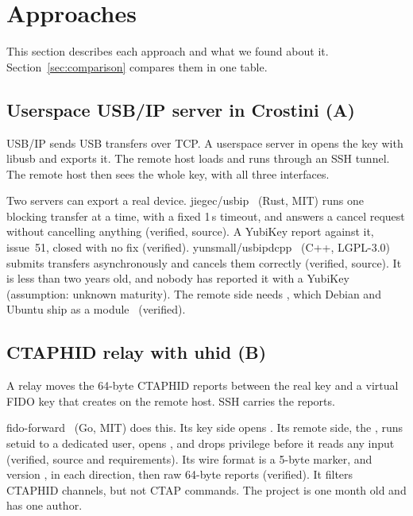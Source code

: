 \section{Approaches}
\label{sec:approaches}

This section describes each approach and what we found about it.
Section~\ref{sec:comparison} compares them in one table.

\subsection{Userspace USB/IP server in Crostini (A)}

USB/IP sends USB transfers over TCP. A userspace server in 
opens the key with libusb and exports it. The remote host loads
 and runs  through an SSH tunnel. The remote
host then sees the whole key, with all three interfaces.

Two servers can export a real device. jiegec/usbip~\cite{jiegec} (Rust, MIT)
runs one blocking transfer at a time, with a fixed 1\,s timeout, and answers
a cancel request without cancelling anything (verified, source). A YubiKey
report against it, issue~51, closed with no fix (verified).
yunsmall/usbipdcpp~\cite{usbipdcpp} (C++, LGPL-3.0) submits transfers
asynchronously and cancels them correctly (verified, source). It is less than
two years old, and nobody has reported it with a YubiKey (assumption: unknown
maturity). The remote side needs , which Debian and Ubuntu
ship as a module~\cite{usbip-deb} (verified).

\subsection{CTAPHID relay with uhid (B)}

A relay moves the 64-byte CTAPHID reports between the real key and a virtual
FIDO key that  creates on the remote host. SSH carries the
reports.

fido-forward~\cite{fidoforward} (Go, MIT) does this. Its key side opens
. Its remote side, the , runs setuid to a
dedicated user, opens , and drops privilege before it reads
any input (verified, source and requirements). Its wire format is a 5-byte
marker,  and version , in each direction, then raw
64-byte reports (verified). It filters CTAPHID channels, but not CTAP
commands. The project is one month old and has one author.

